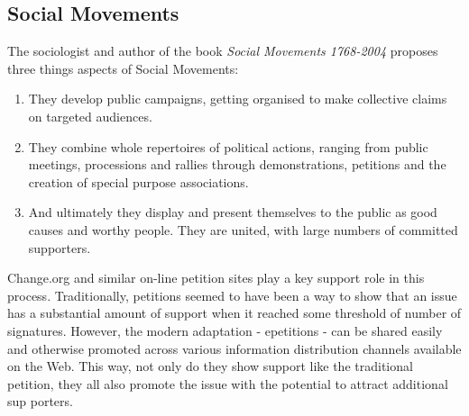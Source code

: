 \subsection{Social Movements}
\label{sec:socmovement}
The sociologist and author of the book \textit{Social Movements 1768-2004} proposes three things aspects of Social Movements:
\begin{enumerate}
\item They develop public campaigns, getting organised to make collective claims on targeted audiences.
\item They combine whole repertoires of political actions, ranging from public meetings, processions and rallies through demonstrations, petitions and the creation of special purpose associations.
\item And ultimately they display and present themselves to the public as good causes and worthy people. They are united, with large numbers of committed supporters.
\end{enumerate}
Change.org and similar on-line petition sites play a key support role in this process. Traditionally, petitions seemed to have been a way to show that an issue has a substantial amount of support when it reached some threshold of number of signatures. However, the modern adaptation - epetitions - can be shared easily  and otherwise promoted across various information distribution channels available on the Web. This way, not only do they show support like the traditional petition, they all also promote the issue with the potential to attract additional sup
porters.

